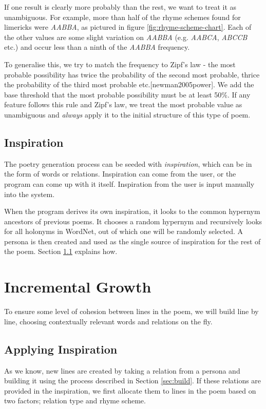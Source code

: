 If one result is clearly more probably than the rest, we want to treat it as unambiguous. For example, more than half of the rhyme schemes found for limericks were \textit{AABBA}, as pictured in figure \ref{fig:rhyme-scheme-chart}. Each of the other values are some slight variation on \textit{AABBA} (e.g. \textit{AABCA}, \textit{ABCCB} etc.) and occur less than a ninth of the \textit{AABBA} frequency.

To generalise this, we try to match the frequency to Zipf's law - the most probable possibility has twice the probability of the second most probable, thrice the probability of the third most probable etc.[newman2005power]. We add the base threshold that the most probable possibility must be at least 50\%. If any feature follows this rule and Zipf's law, we treat the most probable value as unambiguous and \textit{always} apply it to the initial structure of this type of poem.


\subsection{Inspiration}
The poetry generation process can be seeded with \textit{inspiration}, which can be in the form of words or relations. Inspiration can come from the user, or the program can come up with it itself. Inspiration from the user is input manually into the system.

When the program derives its own inspiration, it looks to the common hypernym ancestors of previous poems. It chooses a random hypernym and recursively looks for all holonyms in WordNet, out of which one will be randomly selected. A persona is then created and used as the single source of inspiration for the rest of the poem. Section \ref{sec:apply-inspr} explains how.


\section{Incremental Growth}
\label{sec:inc-growth}
To ensure some level of cohesion between lines in the poem, we will build line by line, choosing contextually relevant words and relations on the fly. 

\subsection{Applying Inspiration}
\label{sec:apply-inspr}
As we know, new lines are created by taking a relation from a persona and building it using the process described in Section \ref{sec:build}. If these relations are provided in the inspiration, we first allocate them to lines in the poem based on two factors; relation type and rhyme scheme.

